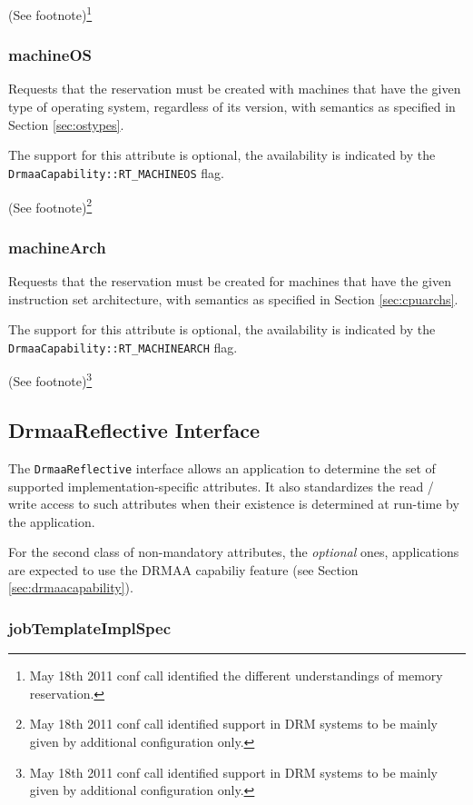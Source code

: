 \documentclass{article}
\newcommand{\h}[1]{\lstinline|#1|}
\newcommand{\rat}[1]{ {\tiny(See footnote)}\footnote{#1} }
\begin{document}
\rat{May 18th 2011 conf call identified the different understandings of memory reservation.}

\subsubsection{machineOS}

Requests that the reservation must be created with machines that have the given type of operating system, regardless of its version, with semantics as specified in Section \ref{sec:ostypes}.

The support for this attribute is optional, the availability is indicated by the \h{DrmaaCapability::RT_MACHINEOS} flag.

\rat{May 18th 2011 conf call identified support in DRM systems to be mainly given by additional configuration only.}

\subsubsection{machineArch}

Requests that the reservation must be created for machines that have the given instruction set architecture,  with semantics as specified in Section \ref{sec:cpuarchs}. 

The support for this attribute is optional, the availability is indicated by the \h{DrmaaCapability::RT_MACHINEARCH} flag. 

\rat{May 18th 2011 conf call identified support in DRM systems to be mainly given by additional configuration only.}

\subsection{DrmaaReflective Interface}
\label{sec:drmaareflective}

The \h{DrmaaReflective} interface allows an application to determine the set of supported implementation-specific attributes. It also standardizes the read / write access to such attributes when their existence is determined at run-time by the application. 

For the second class of non-mandatory attributes, the \emph{optional} ones, applications are expected to use the DRMAA capabiliy feature (see Section \ref{sec:drmaacapability}).



\subsubsection{jobTemplateImplSpec}
\end{document}
